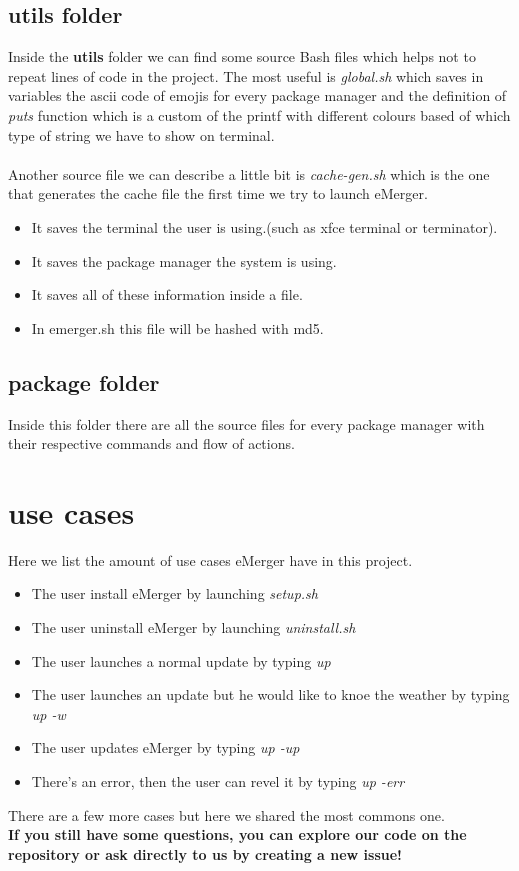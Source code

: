 \documentclass{article}
\begin{document}
\subsection{utils folder}
Inside the \textbf{utils} folder we can find some source Bash files which helps not to repeat lines of code in the project. The most useful is \textit{global.sh} which saves in variables the ascii code of emojis for every package manager and the definition of \textit{puts} function which is a custom of the printf with different colours based of which type of string we have to show on terminal.\\ \\ 
Another source file we can describe a little bit is \textit{cache-gen.sh} which is the one that generates the cache file the first time we try to launch eMerger. 
 
\begin{itemize}
\item It saves the terminal the user is using.(such as xfce terminal or terminator).
\item It saves the package manager the system is using.
\item It saves all of these information inside a file.
\item In emerger.sh this file will be hashed with md5.
\end{itemize}

\subsection{package folder}
Inside this folder there are all the source files for every package manager with their respective commands and flow of actions.
\section{use cases}
Here we list the amount of use cases eMerger have in this project.\\
\begin{itemize}
\item The user install eMerger by launching \textit{setup.sh}
\item The user uninstall eMerger by launching \textit{uninstall.sh}
\item The user launches a normal update by typing \textit{up}
\item The user launches an update but he would like to knoe the weather by typing \textit{up -w}
\item The user updates eMerger by typing \textit{up -up}
\item There's an error, then the user can revel it by typing \textit{up -err}
\end{itemize}
There are a few more cases but here we shared the most commons one.\\
\textbf{If you still have some questions, you can explore our code on the repository or ask directly to us by creating a new issue!}
\end{document}
